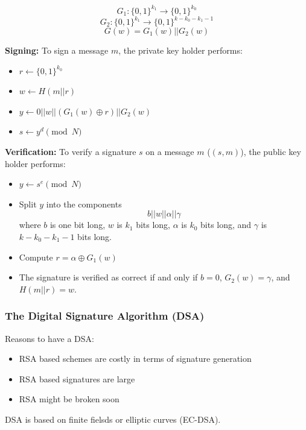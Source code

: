\[ G_1: \{0,1\}^{k_1}  \rightarrow \{0,1\}^{k_0} \]
\[ G_2: \{0,1\}^{k_1}  \rightarrow \{0,1\}^{k - k_0 - k_1 -1} \]
\[ G(w) = G_1(w) || G_2(w)\]

\textbf{Signing:} To sign a message $m$, the private key holder performs:
\begin{itemize}
    \item $r \leftarrow \{0,1\}^{k_0}$
    \item $w \leftarrow H(m||r)$
    \item $y \leftarrow 0||w||(G_1(w)\oplus r)||G_2(w)$
    \item $s \leftarrow y^d \pmod{N}$
\end{itemize}

\textbf{Verification:} To verify a signature $s$ on a message $m$ ($(s,m)$), the public key holder performs:
\begin{itemize}
    \item $y \leftarrow s^e \pmod{N}$
    \item Split $y$ into the components 
    \[ b||w||\alpha||\gamma\]
    where $b$ is one bit long, $w$ is $k_1$ bits long, $\alpha$ is $k_0$ bits long, and $\gamma$ is $k - k_0 - k_1 -1$ bits long.

    \item Compute $r = \alpha \oplus G_1(w)$
    \item The signature is verified as correct if and only if $b = 0$, $G_2(w) = \gamma$, and $H(m||r) = w$.
\end{itemize}

\subsubsection{The Digital Signature Algorithm (DSA)}
Reasons to have a DSA:
\begin{itemize}
    \item RSA based schemes are costly in terms of signature generation
    \item RSA based signatures are large
    \item RSA might be broken soon
\end{itemize}

DSA is based on finite fielsds or elliptic curves (EC-DSA).

